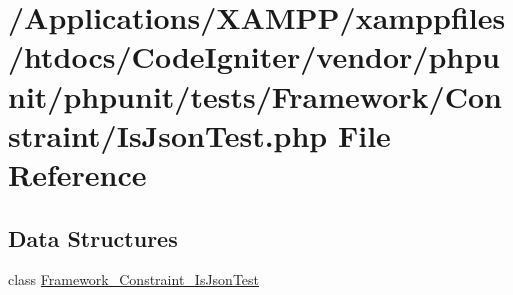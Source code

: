\hypertarget{_is_json_test_8php}{}\section{/\+Applications/\+X\+A\+M\+P\+P/xamppfiles/htdocs/\+Code\+Igniter/vendor/phpunit/phpunit/tests/\+Framework/\+Constraint/\+Is\+Json\+Test.php File Reference}
\label{_is_json_test_8php}
\subsection*{Data Structures}
\begin{DoxyCompactItemize}
\item 
class \mbox{\hyperlink{class_framework___constraint___is_json_test}{Framework\+\_\+\+Constraint\+\_\+\+Is\+Json\+Test}}
\end{DoxyCompactItemize}
